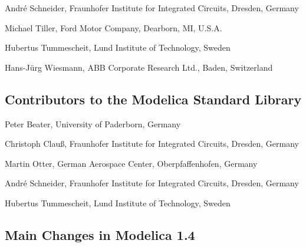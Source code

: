 \documentclass[10pt,a4paper]{report}
\def\doublelabel#1{\label{#1}\hypertarget{#1}{}}
\begin{document}
André Schneider, Fraunhofer Institute for Integrated Circuits, Dresden,
Germany

Michael Tiller, Ford Motor Company, Dearborn, MI, U.S.A.

Hubertus Tummescheit, Lund Institute of Technology, Sweden

Hans-Jürg Wiesmann, ABB Corporate Research Ltd., Baden, Switzerland

\subsection{Contributors to the Modelica Standard Library}\doublelabel{contributors-to-the-modelica-standard-library}

Peter Beater, University of Paderborn, Germany

Christoph Clauß, Fraunhofer Institute for Integrated Circuits, Dresden,
Germany

Martin Otter, German Aerospace Center, Oberpfaffenhofen, Germany

André Schneider, Fraunhofer Institute for Integrated Circuits, Dresden,
Germany

Hubertus Tummescheit, Lund Institute of Technology, Sweden

\subsection{Main Changes in Modelica 1.4}\doublelabel{main-changes-in-modelica-1-4}
\end{document}
